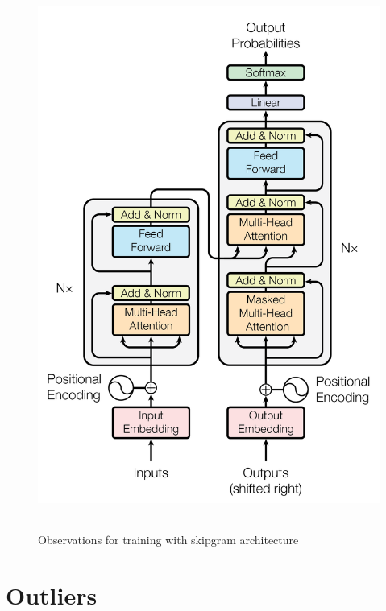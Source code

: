 \begin{figure}[h!]
	\label{fig:transformer}
	\centering
	\includegraphics[height=18cm]{Bilder/preprocessing/BERT/transformer_architecture.png}
	\caption{Observations for training with skipgram architecture}
\end{figure}




\newpage
\section{Outliers}


